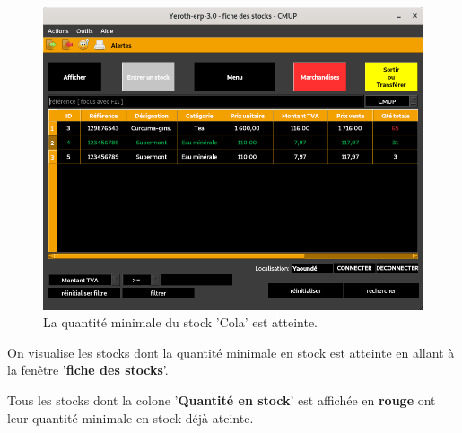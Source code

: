\begin{figure}[!htbp]
	\centering
	\includegraphics[scale=0.63]{images/yeren-fenetre-stock-minimal-atteint.png}
	\caption{La quantit\'e minimale du stock 'Cola' est atteinte.}
	\label{fig:fenetre-lister-quantite-minimale}
\end{figure}

On visualise les stocks dont la quantit\'e minimale en stock
est atteinte en allant \`a la fen\^etre '\textbf{fiche des stocks}'.

Tous les stocks dont la colone '\textbf{Quantit\'e en stock}'
est affich\'ee en \textbf{\textcolor{firebrickred}{rouge}}
ont leur quantit\'e minimale en stock d\'ej\`a ateinte.


{}


